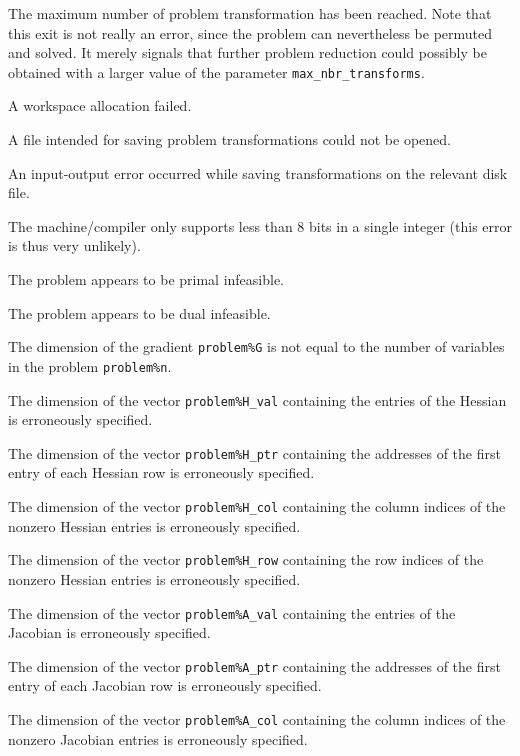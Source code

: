 \documentclass{galahad}
\begin{document}
\begin{description}

 The maximum number of problem transformation has been reached.
Note that this exit is not really an error, since the problem
can  nevertheless be permuted and  solved.  It merely
signals that further problem reduction could possibly
be obtained with a larger value of the parameter
{\tt max\_nbr\_transforms}.

 A workspace allocation failed.

 A file intended for saving problem transformations could not be
opened.

 An input-output error occurred while saving transformations on
the relevant disk file.

 The machine/compiler only supports less than 8 bits in a
single integer (this error is thus very unlikely).

 The problem appears to be primal infeasible.

 The problem appears to be dual infeasible.

 The dimension of the gradient {\tt problem\%G} is not equal to
the number of variables in the problem {\tt problem\%n}.

 The dimension of the vector {\tt problem\%H\_val} containing the
entries of the Hessian is erroneously specified.

 The dimension of the vector {\tt problem\%H\_ptr} containing the
addresses of the first entry of each Hessian row is erroneously specified.

 The dimension of the vector {\tt problem\%H\_col} containing the
column  indices of the nonzero Hessian entries is erroneously specified.

 The dimension of the vector {\tt problem\%H\_row} containing the
row indices of the nonzero Hessian entries is erroneously specified.

 The dimension of the vector {\tt problem\%A\_val} containing the
entries of the Jacobian is erroneously specified.

 The dimension of the vector {\tt problem\%A\_ptr} containing the
addresses of the first entry of each Jacobian row is erroneously specified.

 The dimension of the vector {\tt problem\%A\_col} containing
the column indices of the nonzero Jacobian entries is erroneously specified.


\end{description}
\end{document}
